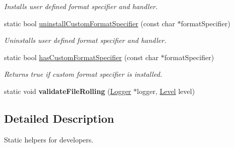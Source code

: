 \begin{DoxyCompactItemize}
\begin{DoxyCompactList}\small\item\em Installs user defined format specifier and handler. \end{DoxyCompactList}\item 
\hypertarget{classel_1_1Helpers_a23ec73819c25758d604d149ad0c6b73f}{static bool \hyperlink{classel_1_1Helpers_a23ec73819c25758d604d149ad0c6b73f}{uninstall\-Custom\-Format\-Specifier} (const char $\ast$format\-Specifier)}\label{classel_1_1Helpers_a23ec73819c25758d604d149ad0c6b73f}

\begin{DoxyCompactList}\small\item\em Uninstalls user defined format specifier and handler. \end{DoxyCompactList}\item 
\hypertarget{classel_1_1Helpers_a154ce041890564d1ae5f87184e24f13d}{static bool \hyperlink{classel_1_1Helpers_a154ce041890564d1ae5f87184e24f13d}{has\-Custom\-Format\-Specifier} (const char $\ast$format\-Specifier)}\label{classel_1_1Helpers_a154ce041890564d1ae5f87184e24f13d}

\begin{DoxyCompactList}\small\item\em Returns true if custom format specifier is installed. \end{DoxyCompactList}\item 
\hypertarget{classel_1_1Helpers_aea3fcde8a07e6f7278574e9563d8ab6b}{static void {\bfseries validate\-File\-Rolling} (\hyperlink{classel_1_1Logger}{Logger} $\ast$logger, \hyperlink{namespaceel_ab0ac6091262344c52dd2d3ad099e8e36}{Level} level)}\label{classel_1_1Helpers_aea3fcde8a07e6f7278574e9563d8ab6b}

\end{DoxyCompactItemize}


\subsection{Detailed Description}
Static helpers for developers. 

